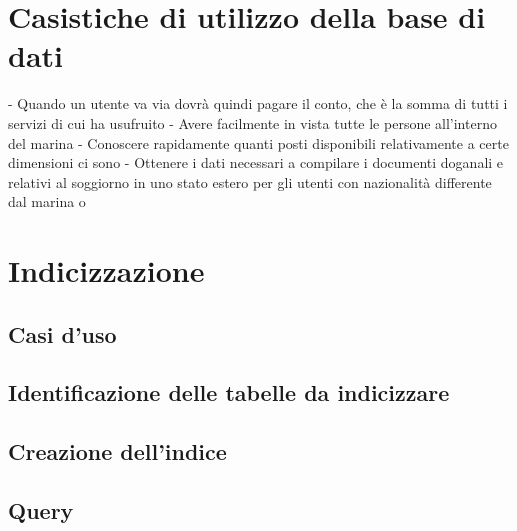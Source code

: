 \section{Casistiche di utilizzo della base di dati}

-	Quando un utente va via dovrà quindi pagare il conto, che è la somma di tutti i servizi di cui ha usufruito
-	Avere facilmente in vista tutte le persone all’interno del marina
-	Conoscere rapidamente quanti posti disponibili relativamente a certe dimensioni ci sono
-	Ottenere i dati necessari a compilare i documenti doganali e relativi al soggiorno in uno stato estero per gli utenti con nazionalità differente dal marina
o
\section{Indicizzazione}
\subsection{Casi d'uso}
\subsection{Identificazione delle tabelle da indicizzare}
\subsection{Creazione dell'indice}
\subsection{Query}
